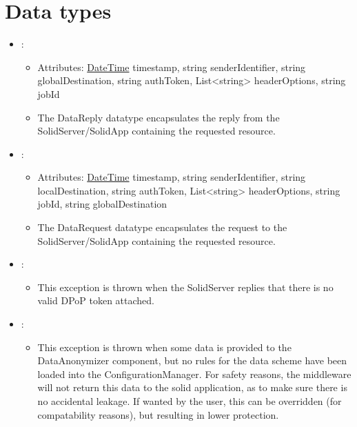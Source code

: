 \section{Data types}\label{sec:datatypes}
\begin{itemize}[nolistsep,noitemsep]
\item {}: 
\begin{itemize}[noitemsep,nolistsep]
\item[] Attributes: {\colorbox{red!30}{\underline{DateTime}}} timestamp, string senderIdentifier, string globalDestination, string authToken, List\textless{}string\textgreater{} headerOptions, string jobId
\item[] The DataReply datatype encapsulates the reply from the SolidServer/SolidApp containing the requested resource.
\end{itemize}

\item {}: 
\begin{itemize}[noitemsep,nolistsep]
\item[] Attributes: {\colorbox{red!30}{\underline{DateTime}}} timestamp, string senderIdentifier, string localDestination, string authToken, List\textless{}string\textgreater{} headerOptions, string jobId, string globalDestination
\item[] The DataRequest datatype encapsulates the request to the SolidServer/SolidApp containing the requested resource.
\end{itemize}

\item {}: 
\begin{itemize}[noitemsep,nolistsep]

\item[] This exception is thrown when the SolidServer replies that there is no valid DPoP token attached.
\end{itemize}

\item {}: 
\begin{itemize}[noitemsep,nolistsep]

\item[] This exception is thrown when some data is provided to the DataAnonymizer component, but no rules for the data scheme have been loaded into the ConfigurationManager. For safety reasons, the middleware will not return this data to the solid application, as to make sure there is no accidental leakage. If wanted by the user, this can be overridden (for compatability reasons), but resulting in lower protection.
\end{itemize}


\end{itemize}
